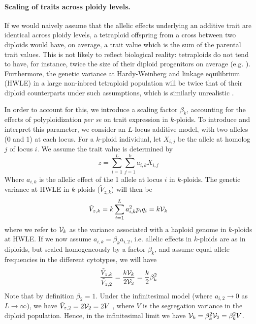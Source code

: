 \documentclass[12pt,a4paper]{article}
\begin{document}
\paragraph{Scaling of traits across ploidy levels.}

If we would naively assume that the allelic effects underlying an additive
trait are identical across ploidy levels, 
a tetraploid offspring from a cross between two diploids would have, on average,
a trait value which is the sum of the parental trait values.
This is not likely to reflect biological reality: tetraploids do not tend to
have, for instance, twice the size of their diploid progenitors on average
(e.g. \cite{porturas2019}).
Furthermore, the genetic variance at Hardy-Weinberg and linkage equilibrium
(HWLE) in a large non-inbred tetraploid population will be twice that of their
diploid counterparts under such assumptions, which is similarly unrealistic
\citep{clo2022}.

In order to account for this, we introduce a scaling factor $\beta_k$,
accounting for the effects of polyploidization \textit{per se} on trait
expression in $k$-ploids.
To introduce and interpret this parameter, we consider an $L$-locus additive
model, with two alleles (0 and 1) at each locus.
For a $k$-ploid individual, let $X_{i,j}$ be the allele at homolog $j$ of locus
$i$.
We assume the trait value is determined by
\begin{equation}
  z = \sum_{i=1}^L\sum_{j=1}^k a_{i,k} X_{i,j}
\end{equation}
Where $a_{i,k}$ is the allelic effect of the 1 allele at locus $i$ in
$k$-ploids.
The genetic variance at HWLE in $k$-ploids ($\tilde{V}_{z,k}$) will then be
\begin{equation}
  \tilde{V}_{z,k} = k\sum_{i=1}^L a_{i,k}^2 p_iq_i = k\mathcal{V}_{k}
\end{equation}
where we refer to $\mathcal{V}_{k}$ as the variance associated with a haploid genome in
$k$-ploids at HWLE.
If we now assume $a_{i,k} = \beta_k a_{i,2}$, i.e. allelic effects in $k$-ploids
are as in diploids, but scaled homogeneously by a factor $\beta_k$, and assume
equal allele frequencies in the different cytotypes, we will have
\begin{equation}
  \frac{\tilde{V}_{z,k}}{\tilde{V}_{z,2}} 
  = \frac{k\mathcal{V}_{k}}{2\mathcal{V}_{2}} = \frac{k}{2} \beta_{k}^2
\end{equation}
Note that by definition $\beta_2=1$.
Under the infinitesimal model (where $a_{i,2} \rightarrow 0$ as $L\rightarrow
\infty$), we have $\tilde{V}_{z,2} = 2\mathcal{V}_{2} = 2V$ \citep{barton2017}, where
$V$ is the segregation variance in the diploid population.
Hence, in the infinitesimal limit we have $\mathcal{V}_{k} = \beta_k^2 \mathcal{V}_{2} =
\beta_k^2 V$.
\end{document}
